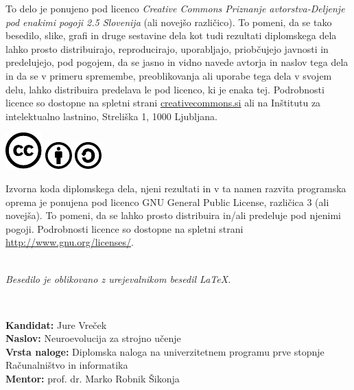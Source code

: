 \documentclass[a4paper,12pt,openright]{book}
\newcommand{\clearemptydoublepage}{\newpage{\pagestyle{empty}\cleardoublepage}}
\newcommand{\CcImageCc}[1]{%
    \includegraphics[scale=#1]{cc_cc_30}%
}
\newcommand{\CcImageBy}[1]{%
    \includegraphics[scale=#1]{cc_by_30}%
}
\newcommand{\CcImageSa}[1]{%
    \includegraphics[scale=#1]{cc_sa_30}%
}
\begin{document}
    \vspace*{5cm}
    {\small \noindent
    To delo je ponujeno pod licenco \textit{Creative Commons Priznanje avtorstva-Deljenje pod enakimi pogoji 2.5 Slovenija} (ali novej\v so razli\v cico).
    To pomeni, da se tako besedilo, slike, grafi in druge sestavine dela kot tudi rezultati diplomskega dela lahko prosto distribuirajo,
        reproducirajo, uporabljajo, priobčujejo javnosti in predelujejo, pod pogojem, da se jasno in vidno navede avtorja in naslov tega
    dela in da se v primeru spremembe, preoblikovanja ali uporabe tega dela v svojem delu, lahko distribuira predelava le pod
    licenco, ki je enaka tej.
    Podrobnosti licence so dostopne na spletni strani \href{http://creativecommons.si}{creativecommons.si} ali na Inštitutu za
    intelektualno lastnino, Streliška 1, 1000 Ljubljana.

    \vspace*{1cm}
        \begin{center}%
            \CcImageCc{0.741573033707865}\hspace*{1ex}\CcImageBy{1}\hspace*{1ex}\CcImageSa{1}%
        \end{center}
    }

    \vspace*{1cm}
    {\small \noindent
    Izvorna koda diplomskega dela, njeni rezultati in v ta namen razvita programska oprema je ponujena pod licenco GNU General Public License,
        različica 3 (ali novejša). To pomeni, da se lahko prosto distribuira in/ali predeluje pod njenimi pogoji.
    Podrobnosti licence so dostopne na spletni strani \url{http://www.gnu.org/licenses/}.
    }

    \vfill
    \begin{center}
        \ \\ \vfill
        {\em
        Besedilo je oblikovano z urejevalnikom besedil \LaTeX.}
    \end{center}

    \clearemptydoublepage

    \thispagestyle{empty}
    \
    \vfill

    \bigskip
    \noindent\textbf{Kandidat:} Jure Vreček\\
    \noindent\textbf{Naslov:} Neuroevolucija za strojno učenje\\
    \noindent\textbf{Vrsta naloge:} Diplomska naloga na univerzitetnem programu prve stopnje Računalništvo in informatika \\
    \noindent\textbf{Mentor:} prof. dr. Marko Robnik Šikonja\\
\end{document}
